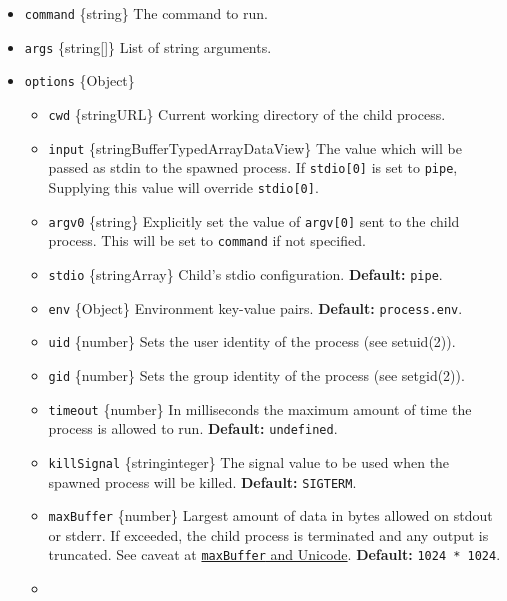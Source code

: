 \begin{itemize}
\tightlist
\item
  \texttt{command} \{string\} The command to run.
\item
  \texttt{args} \{string{[}{]}\} List of string arguments.
\item
  \texttt{options} \{Object\}

  \begin{itemize}
  \tightlist
  \item
    \texttt{cwd} \{string\textbar URL\} Current working directory of the
    child process.
  \item
    \texttt{input}
    \{string\textbar Buffer\textbar TypedArray\textbar DataView\} The
    value which will be passed as stdin to the spawned process. If
    \texttt{stdio{[}0{]}} is set to
    \texttt{\textquotesingle{}pipe\textquotesingle{}}, Supplying this
    value will override \texttt{stdio{[}0{]}}.
  \item
    \texttt{argv0} \{string\} Explicitly set the value of
    \texttt{argv{[}0{]}} sent to the child process. This will be set to
    \texttt{command} if not specified.
  \item
    \texttt{stdio} \{string\textbar Array\} Child's stdio configuration.
    \textbf{Default:} \texttt{\textquotesingle{}pipe\textquotesingle{}}.
  \item
    \texttt{env} \{Object\} Environment key-value pairs.
    \textbf{Default:} \texttt{process.env}.
  \item
    \texttt{uid} \{number\} Sets the user identity of the process (see
    setuid(2)).
  \item
    \texttt{gid} \{number\} Sets the group identity of the process (see
    setgid(2)).
  \item
    \texttt{timeout} \{number\} In milliseconds the maximum amount of
    time the process is allowed to run. \textbf{Default:}
    \texttt{undefined}.
  \item
    \texttt{killSignal} \{string\textbar integer\} The signal value to
    be used when the spawned process will be killed. \textbf{Default:}
    \texttt{\textquotesingle{}SIGTERM\textquotesingle{}}.
  \item
    \texttt{maxBuffer} \{number\} Largest amount of data in bytes
    allowed on stdout or stderr. If exceeded, the child process is
    terminated and any output is truncated. See caveat at
    \hyperref[maxbuffer-and-unicode]{\texttt{maxBuffer} and Unicode}.
    \textbf{Default:} \texttt{1024\ *\ 1024}.
  \item

\end{itemize}
\end{itemize}
